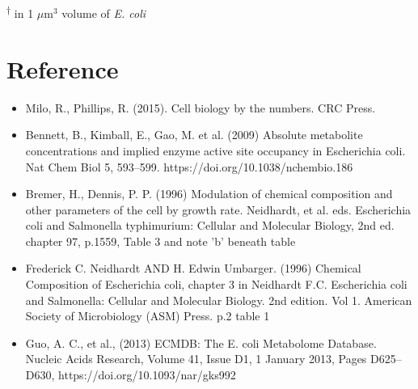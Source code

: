 \documentclass{article}
\begin{document}
            \textsuperscript{$\dagger$} in 1 $\mu$m$^{3}$ volume of \textit{E. coli}

            
            



    \section{Reference}
    \begin{itemize}
        \item Milo, R., Phillips, R. (2015). Cell biology by the numbers. CRC Press.
        \item Bennett, B., Kimball, E., Gao, M. et al. (2009) Absolute metabolite concentrations and implied enzyme active site occupancy in Escherichia coli. Nat Chem Biol 5, 593–599. https://doi.org/10.1038/nchembio.186
        \item Bremer, H., Dennis, P. P. (1996) Modulation of chemical composition and other parameters of the cell by growth rate. Neidhardt, et al. eds. Escherichia coli and Salmonella typhimurium: Cellular and Molecular Biology, 2nd ed. chapter 97, p.1559, Table 3 and note 'b' beneath table
        \item Frederick C. Neidhardt AND H. Edwin Umbarger. (1996)  Chemical Composition of Escherichia coli, chapter 3 in Neidhardt F.C. Escherichia coli and Salmonella: Cellular and Molecular Biology. 2nd edition. Vol 1. American Society of Microbiology (ASM) Press. p.2 table 1
        \item Guo, A. C., et al., (2013) ECMDB: The E. coli Metabolome Database. Nucleic Acids Research, Volume 41, Issue D1, 1 January 2013, Pages D625–D630, https://doi.org/10.1093/nar/gks992
    \end{itemize} 
\end{document}
